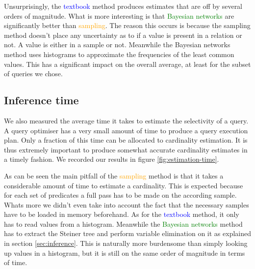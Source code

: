 \documentclass[runningheads]{llncs}
\begin{document}

Unsurprisingly, the \textcolor{blue}{textbook} method produces estimates that are off by several orders of magnitude. What is more interesting is that \textcolor{green}{Bayesian networks} are significantly better than \textcolor{orange}{sampling}. The reason this occurs is because the sampling method doesn't place any uncertainty as to if a value is present in a relation or not. A value is either in a sample or not. Meanwhile the Bayesian networks method uses histograms to approximate the frequencies of the least common values. This has a significant impact on the overall average, at least for the subset of queries we chose.

\subsection{Inference time}

We also measured the average time it takes to estimate the selectivity of a query. A query optimiser has a very small amount of time to produce a query execution plan. Only a fraction of this time can be allocated to cardinality estimation. It is thus extremely important to produce somewhat accurate cardinality estimates in a timely fashion. We recorded our results in figure \ref{fig:estimation-time}.


As can be seen the main pitfall of the \textcolor{orange}{sampling} method is that it takes a considerable amount of time to estimate a cardinality. This is expected because for each set of predicates a full pass has to be made on the according sample. Whats more we didn't even take into account the fact that the necessary samples have to be loaded in memory beforehand. As for the \textcolor{blue}{textbook} method, it only has to read values from a histogram. Meanwhile the \textcolor{green}{Bayesian networks} method has to extract the Steiner tree and perform variable elimination on it as explained in section \ref{sec:inference}. This is naturally more burdensome than simply looking up values in a histogram, but it is still on the same order of magnitude in terms of time.
\end{document}
